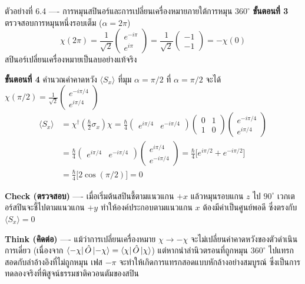 \begin{psctbox}{ตัวอย่างที่ 6.4 ---- การหมุนสปินอร์และการเปลี่ยนเครื่องหมายภายใต้การหมุน $360^\circ$}
\textbf{ขั้นตอนที่ 3} ตรวจสอบการหมุนหนึ่งรอบเต็ม ($\alpha = 2\pi$)
\begin{equation*}
\chi(2\pi) = \frac{1}{\sqrt{2}} \begin{pmatrix} e^{-i\pi} \\ e^{i\pi} \end{pmatrix} = \frac{1}{\sqrt{2}} \begin{pmatrix} -1 \\ -1 \end{pmatrix} = -\chi(0)
\end{equation*}
สปินอร์เปลี่ยนเครื่องหมายเป็นลบอย่างแท้จริง

\textbf{ขั้นตอนที่ 4} คำนวณค่าคาดหวัง $\langle S_x \rangle$ ที่มุม $\alpha = \pi/2$
ที่ $\alpha = \pi/2$ จะได้ $\chi(\pi/2) = \frac{1}{\sqrt{2}}\begin{pmatrix} e^{-i\pi/4} \\ e^{i\pi/4} \end{pmatrix}$
\begin{align*}
\langle S_x \rangle &= \chi^\dagger \left( \frac{\hbar}{2}\sigma_x \right) \chi = \frac{\hbar}{4} \begin{pmatrix} e^{i\pi/4} & e^{-i\pi/4} \end{pmatrix} \begin{pmatrix} 0 & 1 \\ 1 & 0 \end{pmatrix} \begin{pmatrix} e^{-i\pi/4} \\ e^{i\pi/4} \end{pmatrix} \\
&= \frac{\hbar}{4} \begin{pmatrix} e^{i\pi/4} & e^{-i\pi/4} \end{pmatrix} \begin{pmatrix} e^{i\pi/4} \\ e^{-i\pi/4} \end{pmatrix} = \frac{\hbar}{4} \big[ e^{i\pi/2} + e^{-i\pi/2} \big] \\
&= \frac{\hbar}{4} \big[ 2 \cos(\pi/2) \big] = 0
\end{align*}

\textbf{Check (ตรวจสอบ)} ---- เมื่อเริ่มต้นสปินชี้ตามแนวแกน $+x$ แล้วหมุนรอบแกน $z$ ไป $90^\circ$ เวกเตอร์สปินจะชี้ไปตามแนวแกน $+y$ ทำให้องค์ประกอบตามแนวแกน $x$ ต้องมีค่าเป็นศูนย์พอดี ซึ่งตรงกับ $\langle S_x \rangle = 0$

\textbf{Think (คิดต่อ)} ---- แม้ว่าการเปลี่ยนเครื่องหมาย $\chi \to -\chi$ จะไม่เปลี่ยนค่าคาดหวังของตัวดำเนินการเดี่ยว (เนื่องจาก $\bra{-\chi}\hat{O}\ket{-\chi} = \bra{\chi}\hat{O}\ket{\chi}$) แต่หากนำลำนิวตรอนที่ถูกหมุน $360^\circ$ ไปแทรกสอดกับลำอ้างอิงที่ไม่ถูกหมุน เฟส $-\pi$ จะทำให้เกิดการแทรกสอดแบบหักล้างอย่างสมบูรณ์ ซึ่งเป็นการทดลองจริงที่พิสูจน์ธรรมชาติควอนตัมของสปิน
\end{psctbox}

